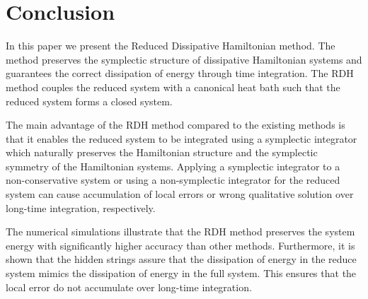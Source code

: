 \section{Conclusion} \label{sec:5}

In this paper we present the Reduced Dissipative Hamiltonian method. The method preserves the symplectic structure of dissipative Hamiltonian systems and guarantees the correct dissipation of energy through time integration. The RDH method couples the reduced system with a canonical heat bath such that the reduced system forms a closed system.

The main advantage of the RDH method compared to the existing methods is that it enables the reduced system to be integrated using a symplectic integrator which naturally preserves the Hamiltonian structure and the symplectic symmetry of the Hamiltonian systems. Applying a symplectic integrator to a non-conservative system or using a non-symplectic integrator for the reduced system can cause accumulation of local errors or wrong qualitative solution over long-time integration, respectively.

The numerical simulations illustrate that the RDH method preserves the system energy with significantly higher accuracy than other methods. Furthermore, it is shown that the hidden strings assure that the dissipation of energy in the reduce system mimics the dissipation of energy in the full system. This ensures that the local error do not accumulate over long-time integration.

